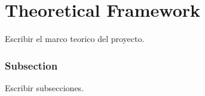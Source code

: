 \chapter{Theoretical Framework}

Escribir el marco teorico del proyecto.

\subsection{Subsection}

Escribir subsecciones.


